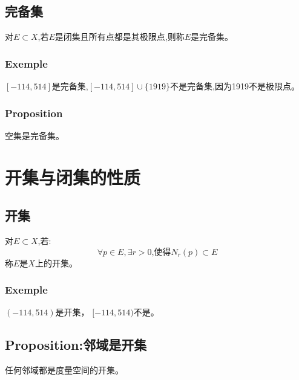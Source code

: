 \documentclass[12pt, a4paper, oneside]{ctexbook}
\begin{document}
  \subsection{完备集}
  对$E\subset X$,若$E$是闭集且所有点都是其极限点,则称$E$是完备集。
  \subsubsection{Exemple}
  $[-114,514]$是完备集,$[-114,514]\cup\{1919\}$不是完备集,因为1919不是极限点。
  \subsubsection{Proposition}
  空集是完备集。

\section{开集与闭集的性质}
  \subsection{开集}
  对$E\subset X$,若:
  $$
    \forall p\in E, \exists r>0\text{,使得}N_r(p)\subset E
  $$称$E$是$X$上的开集。
  \subsubsection{Exemple}
  $(-114,514)$是开集， $[-114,514)$不是。

  \subsection{Proposition:邻域是开集}
  任何邻域都是度量空间的开集。
\end{document}
